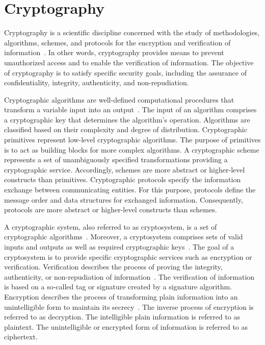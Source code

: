 \section{Cryptography}
\label{sec:fundamentals:cryptography}
Cryptography is a scientific discipline concerned with the study of methodologies, algorithms, schemes, and protocols for the encryption and verification of information~\cite{Barker2016,Barker2020,CNSS2022}.
In other words, cryptography provides means to prevent unauthorized access and to enable the verification of information.
The objective of cryptography is to satisfy specific security goals, including the assurance of confidentiality, integrity, authenticity, and non-repudiation.

Cryptographic algorithms are well-defined computational procedures that transform a variable input into an output~\cite{Barker2020}.
The input of an algorithm comprises a cryptographic key that determines the algorithm's operation.
Algorithms are classified based on their complexity and degree of distribution.
Cryptographic primitives represent low-level cryptographic algorithms.
The purpose of primitives is to act as building blocks for more complex algorithms.
A cryptographic scheme represents a set of unambiguously specified transformations providing a cryptographic service.
Accordingly, schemes are more abstract or higher-level constructs than primitives.
Cryptographic protocols specify the information exchange between communicating entities.
For this purpose, protocols define the message order and data structures for exchanged information.
Consequently, protocols are more abstract or higher-level constructs than schemes.

A cryptographic system, also referred to as cryptosystem, is a set of cryptographic algorithms~\cite{Menezes1996}.
Moreover, a cryptosystem comprises sets of valid inputs and outputs as well as required cryptographic keys~\cite{Eckert2023}.
The goal of a cryptosystem is to provide specific cryptographic services such as encryption or verification.
Verification describes the process of proving the integrity, authenticity, or non-repudiation of information~\cite{Boneh2023}.
The verification of information is based on a so-called tag or signature created by a signature algorithm.
Encryption describes the process of transforming plain information into an unintelligible form to maintain its secrecy~\cite{Barker2016,Boneh2023}.
The inverse process of encryption is referred to as decryption.
The intelligible plain information is referred to as plaintext.
The unintelligible or encrypted form of information is referred to as ciphertext.

